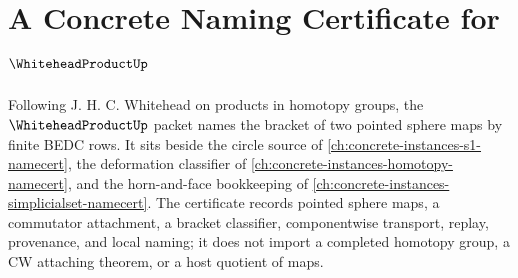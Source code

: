 \chapter{A Concrete Naming Certificate for $\WhiteheadProductUp$}
\label{ch:concrete-instances-whitehead-product-namecert}

Following J. H. C. Whitehead on products in homotopy groups, the $\WhiteheadProductUp$ packet names the bracket of two pointed sphere maps by finite BEDC rows. It sits beside the circle source of \autoref{ch:concrete-instances-s1-namecert}, the deformation classifier of \autoref{ch:concrete-instances-homotopy-namecert}, and the horn-and-face bookkeeping of \autoref{ch:concrete-instances-simplicialset-namecert}. The certificate records pointed sphere maps, a commutator attachment, a bracket classifier, componentwise transport, replay, provenance, and local naming; it does not import a completed homotopy group, a CW attaching theorem, or a host quotient of maps.

